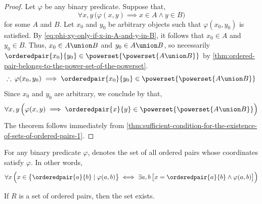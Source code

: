 \begin{proof}
    Let \( \varphi \) be any binary predicate. Suppose that,
    \begin{equation}
        \label{eq:phi-xy-only-if-x-in-A-and-y-in-B}
        \forall x,y \, \Big( \varphi(x,y) \implies x \in A \land y \in B \Big)
    \end{equation}
    for some \( A \) and \( B \). Let \( x_{0} \) and \( y_{0} \) be arbitrary objects
    such that \( \varphi(x_{0}, y_{0}) \) is satisfied. By \eqref{eq:phi-xy-only-if-x-in-A-and-y-in-B},
    it follows that \( x_{0} \in A \) and \( y_{0} \in B \). Thus, \( x_{0} \in A \union B \) and
    \( y_{0} \in A \union B\),
    so necessarily \( \orderedpair{x_{0}}{y_{0}} \in \powerset{\powerset{A \union B}} \)
    by \cref{thm:ordered-pair-belongs-to-the-power-set-of-the-powerset}.
    \begin{equation*}
        \therefore \, \varphi(x_{0}, y_{0}) \implies \orderedpair{x_{0}}{y_{0}} \in \powerset{\powerset{A \union B}}
    \end{equation*}
    Since \( x_{0} \) and \( y_{0} \) are arbitrary, we conclude by  that,
    \begin{equation*}
        \forall x,y \, \Big( \varphi(x,y) \implies \orderedpair{x}{y} \in \powerset{\powerset{A \union B}} \Big)
    \end{equation*}
    The theorem follows immediately from \cref{thm:sufficient-condition-for-the-existence-of-sets-of-ordered-pairs-1}.
\end{proof}

\begin{dfn}
    \label{dfn:set-builder-notation-ordered-pair}
    For any binary predicate \( \varphi \),  denotes the set
    of all ordered pairs whose coordinates satisfy \( \varphi \). In other words,
    \begin{equation*}
        \forall x \, \Big( x \in \big\{ \orderedpair{a}{b} \mid \varphi(a,b) \big\} \iff
        \exists a,b \, \big[ x = \orderedpair{a}{b} \land \varphi(a,b) \big] \Big)
    \end{equation*}
\end{dfn}

\begin{thm}
    \label{thm:existence-of-the-domain-of-a-set-of-ordered-pairs}
    If \( R \) is a set of ordered pairs, then the set
     exists.
\end{thm}

